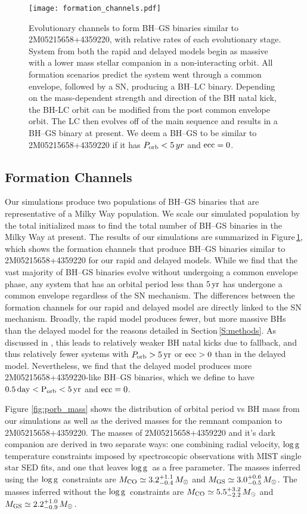 \documentclass[twocolumn,tighten]{aastex61}
\newcommand{\msun}{{M_\odot}}
\newcommand{\days}{\rm{day}}
\newcommand{\ecc}{\rm{ecc}}
\newcommand{\yr}{\rm{yr}}
\newcommand{\logg}{$\rm{log\,g}$}
\begin{document}
\begin{figure}
    \centering
    \texttt{[image: formation\_channels.pdf]}
    \caption{Evolutionary channels to form BH--GS binaries similar to 2M05215658+4359220, with relative rates of each evolutionary stage. System from both the rapid and delayed models begin as massive with a lower mass stellar companion in a non-interacting orbit. All formation scenarios predict the system went through a common envelope, followed by a SN, producing a BH--LC binary. Depending on the mass-dependent strength and direction of the BH natal kick, the BH-LC orbit can be modified from the post common envelope orbit. The LC then evolves off of the main sequence and results in a BH--GS binary at present. We deem a BH--GS to be similar to 2M05215658+4359220 if it has $P_{\rm{orb}}<5\,yr$ and $\rm{ecc}=0$.}
    \label{fig:formation_channel}
\end{figure}
\subsection{Formation Channels}
\label{subS:formation_channels}

Our simulations produce two populations of BH--GS binaries that are representative of a Milky Way population. We scale our simulated population by the total initialized mass to find the total number of BH--GS binaries in the Milky Way at present. The results of our simulations are summarized in Figure\,\ref{fig:formation_channel}, which shows the formation channels that produce BH--GS binaries similar to 2M05215658+4359220 for our rapid and delayed models. While we find that the vast majority of BH--GS binaries evolve without undergoing a common envelope phase, any system that has an orbital period less than $5\,\yr$ has undergone a common envelope regardless of the SN mechanism. The differences between the formation channels for our rapid and delayed model are directly linked to the SN mechanism. Broadly, the rapid model produces fewer, but more massive BHs than the delayed model for the reasons detailed in Section\,\ref{S:methods}. As discussed in \citet{Breivik2017_gaia}, this leads to relatively weaker BH natal kicks due to fallback, and thus relatively fewer systems with $P_{\rm{orb}}>5\,\yr$ or $\ecc>0$ than in the delayed model. Nevertheless, we find that the delayed model produces more 2M05215658+4359220-like BH--GS binaries, which we define to have $0.5\,\days<P_{\rm{orb}}<5\,\yr$ and $\ecc=0$.

Figure \ref{fig:porb_mass} shows the distribution of orbital period vs BH mass from our simulations as well as the derived masses for the remnant companion to 2M05215658+4359220. The masses of 2M05215658+4359220 and it's dark companion are derived in two separate ways: one combining radial velocity, \logg\, temperature constraints imposed by spectroscopic observations with MIST single star SED fits, and one that leaves \logg\ as a free parameter. The masses inferred using the \logg\ constraints are $M_{\rm{CO}}\simeq3.2^{+1.1}_{-0.4}\,\msun$ and $M_{\rm{GS}}\simeq3.0^{+0.6}_{-0.5}\,\msun$. The masses inferred without the \logg\ constraints are $M_{\rm{CO}}\simeq5.5^{+3.2}_{-2.2}\,\msun$ and $M_{\rm{GS}}\simeq2.2^{+1.0}_{-0.9}\,\msun$.  
\end{document}
